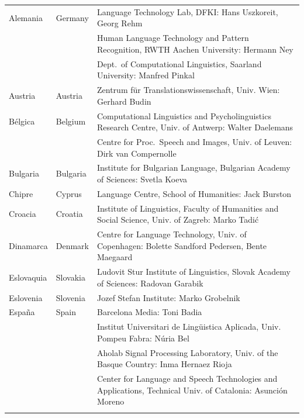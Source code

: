 \small
\begin{longtable}{@{}llp{113mm}@{}}
  Alemania & \textcolor{grey1}{Germany} & Language Technology Lab, DFKI: Hans Uszkoreit, Georg Rehm \\ \addlinespace
  & & Human Language Technology and Pattern Recognition, RWTH Aachen University: Hermann Ney \\ \addlinespace
  & & Dept.~of Computational Linguistics, Saarland University: Manfred Pinkal \\ \addlinespace 
  Austria & \textcolor{grey1}{Austria} & Zentrum für Translationswissenschaft, Univ. Wien: Gerhard Budin \\ \addlinespace 
  Bélgica & \textcolor{grey1}{Belgium} & Computational Linguistics and Psycholinguistics Research Centre, Univ. of Antwerp: Walter Daelemans \\ \addlinespace
  & & Centre for Proc.~Speech and Images, Univ. of Leuven: Dirk van Compernolle \\ \addlinespace
  Bulgaria & \textcolor{grey1}{Bulgaria} & Institute for Bulgarian Language, Bulgarian Academy of Sciences: Svetla Koeva \\ \addlinespace
  Chipre & \textcolor{grey1}{Cyprus} & Language Centre, School of Humanities: Jack Burston \\ \addlinespace
  Croacia & \textcolor{grey1}{Croatia} & Institute of Linguistics, Faculty of Humanities and Social Science, Univ. of Zagreb: Marko Tadić \\ \addlinespace
  Dinamarca &  \textcolor{grey1}{Denmark} & Centre for Language Technology, Univ. of Copenhagen: Bolette Sandford Pedersen, Bente Maegaard \\ \addlinespace
  Eslovaquia & \textcolor{grey1}{Slovakia} & Ludovit Stur Institute of Linguistics, Slovak Academy of Sciences: Radovan Garabik \\ \addlinespace 
  Eslovenia & \textcolor{grey1}{Slovenia} & Jozef Stefan Institute: Marko Grobelnik \\ \addlinespace 
  España & \textcolor{grey1}{Spain} & Barcelona Media: Toni Badia \\ \addlinespace 
  & & Institut Universitari de Lingüistica Aplicada, Univ. Pompeu Fabra: Núria Bel \\ \addlinespace 
  & & Aholab Signal Processing Laboratory, Univ. of the Basque Country: Inma Hernaez Rioja \\ \addlinespace 
  & & Center for Language and Speech Technologies and Applications, Technical Univ. of Catalonia: Asunción Moreno \\ \addlinespace 

\end{longtable}
